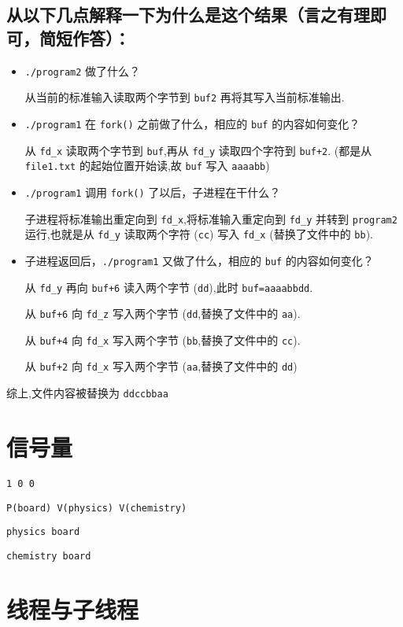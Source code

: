     \subsection{ 从以下几点解释一下为什么是这个结果（言之有理即可，简短作答）：}
    \begin{itemize}
        \item  \texttt{./program2} 做了什么？

            从当前的标准输入读取两个字节到 \texttt{buf2} 再将其写入当前标准输出.
        \item \texttt{./program1} 在 \texttt{fork()} 之前做了什么，相应的 \texttt{buf} 的内容如何变化？

            从 \texttt{fd\_x} 读取两个字节到 \texttt{buf},再从 \texttt{fd\_y} 读取四个字符到 \texttt{buf+2}. (都是从 \texttt{file1.txt} 的起始位置开始读,故 \texttt{buf} 写入 \texttt{aaaabb})

        \item \texttt{./program1} 调用 \texttt{fork()} 了以后，子进程在干什么？

            子进程将标准输出重定向到 \texttt{fd\_x},将标准输入重定向到 \texttt{fd\_y} 并转到 \texttt{program2} 运行,也就是从 \texttt{fd\_y} 读取两个字符 (\texttt{cc}) 写入 \texttt{fd\_x} (替换了文件中的 \texttt{bb}).
        \item 子进程返回后，\texttt{./program1} 又做了什么，相应的 \texttt{buf} 的内容如何变化？

            从 \texttt{fd\_y} 再向 \texttt{buf+6} 读入两个字节 (\texttt{dd}),此时 \texttt{buf=aaaabbdd}.

            从 \texttt{buf+6} 向 \texttt{fd\_z} 写入两个字节 (\texttt{dd},替换了文件中的 \texttt{aa}).

            从 \texttt{buf+4} 向 \texttt{fd\_x} 写入两个字节 (\texttt{bb},替换了文件中的 \texttt{cc}).

            从 \texttt{buf+2} 向 \texttt{fd\_x} 写入两个字节 (\texttt{aa},替换了文件中的 \texttt{dd})
    \end{itemize}
    综上,文件内容被替换为 \texttt{ddccbbaa}
    \section{信号量}
    \texttt{1 0 0}

    \texttt{P(board) V(physics) V(chemistry)}

    \texttt{physics board}

    \texttt{chemistry board}
    \section{线程与子线程}
